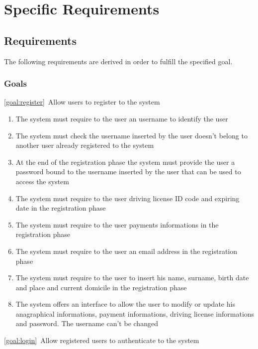 \section{Specific Requirements}

\subsection{Requirements}
The following requirements are derived in order to fulfill the specified goal.
\subsubsection{Goals}
	\begin{description}
		\item \ref{goal:register}\ Allow users to register to the system
			\begin{enumerate}[label=\textbf{R\arabic*}]
  				\item The system must require to the user an username to identify the user
   				\item The system must check the username inserted by the user doesn't belong to another user already
   				registered to the system 
   				\item At the end of the registration phase the system must provide the user a password bound to the
   				username inserted by the user that can be used to access the system
   				\item The system must require to the user driving license ID code and expiring date in the registration
   				phase
   				\item The system must require to the user payments informations in the registration phase
   				\item The system must require to the user an email address in the registration phase
   				\item The system must require to the user to insert his name, surname, birth date and place and current
   				domicile in the registration phase
   				\item The system offers an interface to allow the user to modify or update his anagraphical informations,
   				payment informations, driving license informations and password. The username can't be changed
  			\end{enumerate}
		\item \ref{goal:login}\ Allow registered users to authenticate to the system
			\begin{enumerate}[label=\textbf{R\arabic*}]

\end{enumerate}
\end{description}
